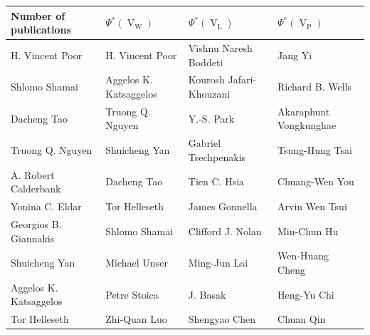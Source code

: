 \documentclass[journal,twocolumn,10pt]{IEEEtran}
\theoremstyle{definition}
\DeclareMathOperator{\LL}{L}
\DeclareMathOperator{\Pj}{P}
\DeclareMathOperator{\Vm}{V}
\DeclareMathOperator{\W}{W}
\begin{document}
\begin{table}[htbp]
  \footnotesize
  \begin{center}
    \begin{tabular}{@{}llll@{}}
      \toprule
      Number of publications &  $\Psi^*{(\Vm_{\W})}$  &  $\Psi^*{(\Vm_{\LL})}$  &  $\Psi^*{(\Vm_{\Pj})}$  \\
      \midrule \addlinespace[1mm]
H. Vincent Poor  & H. Vincent Poor & Vishnu Naresh Boddeti  & Jang Yi \\

Shlomo Shamai & Aggelos K. Katsaggelos & Kourosh Jafari-Khouzani & Richard B. Wells \\

Dacheng Tao  & Truong Q. Nguyen  & Y.-S. Park  & Akaraphunt Vongkunghae \\

Truong Q. Nguyen & Shuicheng Yan  & Gabriel Tsechpenakis &  Tsung-Hung Tsai \\

A. Robert Calderbank & Dacheng Tao  & Tien C. Hsia &   Chuang-Wen You  \\

Yonina C. Eldar  & Tor Helleseth  & James Gonnella &   Arvin Wen Tsui  \\

Georgios B. Giannakis & Shlomo Shamai  & Clifford J. Nolan &  Min-Chun Hu \\

Shuicheng Yan & Michael Unser  & Ming-Jun Lai &  Wen-Huang Cheng  \\

Aggelos K. Katsaggelos & Petre Stoica & J. Basak &  Heng-Yu Chi \\

Tor Helleseth & Zhi-Quan Luo  & Shengyao Chen &  Chuan Qin \\







\end{tabular}
\end{center}
\end{table}
\end{document}
